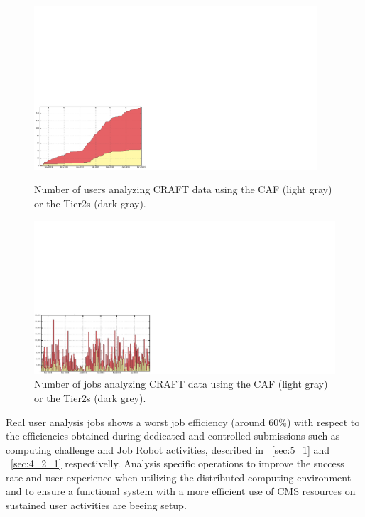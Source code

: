 %
\begin{figure}
\begin{minipage}{.48\textwidth}
\centering
\includegraphics[width=0.94\textwidth]{figures/CRAFTusers.pdf}
\caption{Number of users analyzing CRAFT data using the CAF (light gray) or the Tier2s (dark gray).}
\label{fig:CRAFTusers}
\end{minipage}
\begin{minipage}{.48\textwidth}
\centering
\includegraphics[width=1.06\textwidth]{figures/CRAFTjobs.pdf}
\caption{Number of jobs analyzing CRAFT data using the CAF (light gray) or the Tier2s (dark grey).}
\label{fig:CRAFTjobs}
\end{minipage}
\end{figure}


Real user analysis jobs shows a worst job efficiency (around 60\%) with respect to the efficiencies obtained during dedicated and controlled submissions such 
as computing challenge and Job Robot activities, described in ~\ref{sec:5_1} and ~\ref{sec:4_2_1} respectivelly.
Analysis specific operations to improve the success rate and user experience when utilizing the distributed computing environment and to ensure a functional system with a more efficient use of CMS resources on sustained user activities are beeing setup.


